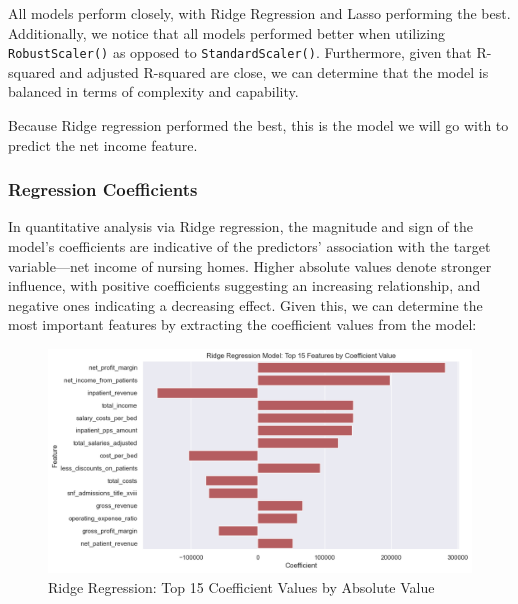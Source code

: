 \documentclass{article}
\theoremstyle{mytheoremstyle}
\theoremstyle{mytheoremstyle}
\theoremstyle{myproblemstyle}
\begin{document}
\FloatBarrier %

All models perform closely, with Ridge Regression and Lasso performing the best. Additionally, we notice that all models performed better when utilizing \texttt{RobustScaler()} as opposed to \texttt{StandardScaler()}. Furthermore, given that R-squared and adjusted R-squared are close, we can determine that the model is balanced in terms of complexity and capability. 

Because Ridge regression performed the best, this is the model we will go with to predict the net income feature. 
\pagebreak

\subsubsection{Regression Coefficients}

In quantitative analysis via Ridge regression, the magnitude and sign of the model's coefficients are indicative of the predictors' association with the target variable—net income of nursing homes. Higher absolute values denote stronger influence, with positive coefficients suggesting an increasing relationship, and negative ones indicating a decreasing effect. Given this, we can determine the most important features by extracting the coefficient values from the model:


\begin{figure}[htbp]
\centering
\includegraphics[width=\linewidth]{Images/feat_importance.png}
\caption{Ridge Regression: Top 15 Coefficient Values by Absolute Value}
\label{fig:Robust Scaler Results}
\end{figure}
\end{document}

